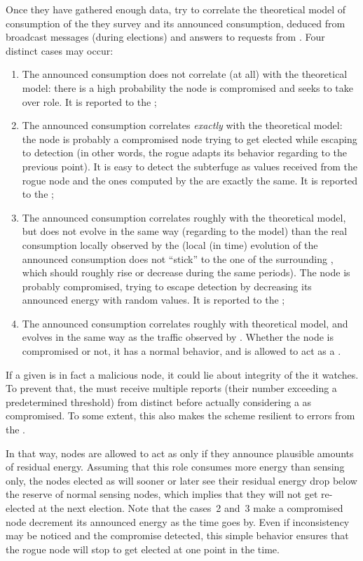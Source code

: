 Once they have gathered enough data, \vns try to correlate the theoretical model of consumption of the \cn they survey and its announced consumption, deduced from broadcast messages (during elections) and answers to requests from \vns.
Four distinct cases may occur:
\begin{enumerate}
    \item The announced consumption does not correlate (at all) with the theoretical model: there is a high probability the node is compromised and seeks to take over \cn role. It is reported to the \ch;
    \item The announced consumption    correlates \emph{exactly} with the theoretical model: the node is probably a compromised node trying to get elected while escaping to detection (in other words, the rogue \cn adapts its behavior regarding to the previous point). It is easy to detect the subterfuge as values received from the rogue node and the ones computed by the \vns are exactly the same. It is reported to the \ch;
    \item The announced consumption correlates roughly with the theoretical model, but does not evolve in the same way (regarding to the model) than the real consumption locally observed by the \vns (local (in time) evolution of the announced consumption does not ``stick'' to the one of the surrounding \vns, which should roughly rise or decrease during the same periods). The node is probably compromised, trying to escape detection by decreasing its announced energy with random values. It is reported to the \CH;
    \item The announced consumption correlates roughly with theoretical model, and evolves in the same way as the traffic observed by \vns. Whether the node is compromised or not, it has a normal behavior, and is allowed to act as a \cn.        
\end{enumerate}
If a given \vn is in fact a malicious node, it could lie about integrity of the \cn it watches.
To prevent that, the \ch must receive multiple reports (their number exceeding a predetermined threshold) from distinct \vns before actually considering a \cn as compromised.
To some extent, this also makes the scheme resilient to errors from the \vns.

In that way, nodes are allowed to act as \cns only if they announce plausible amounts of residual energy.
Assuming that this role consumes more energy than sensing only, the nodes elected as \cns will sooner or later see their residual energy drop below the reserve of normal sensing nodes, which implies that they will not get re-elected at the next election.
Note that the cases~2 and~3 make a compromised node decrement its announced energy as the time goes by.
Even if inconsistency may be noticed and the compromise detected, this simple behavior ensures that the rogue node will stop to get elected at one point in the time.

